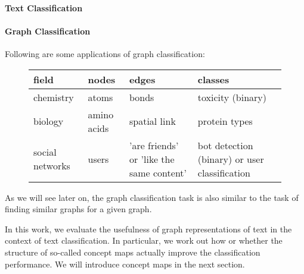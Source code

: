 

\paragraph{Text Classification}

\paragraph{Graph Classification}

Following are some applications of graph classification:

\begin{figure}[ht]
\centering
\begin{tabular}{llll}
field & nodes & edges & classes \\
\midrule
chemistry & atoms & bonds & toxicity (binary) \\
biology & amino acids & spatial link & protein types \\ 
social networks & users & 'are friends' or 'like the same content' & bot detection (binary) or user classification
\end{tabular}
\end{figure}

As we will see later on, the graph classification task is also similar to the task of finding similar graphs for a given graph.

In this work, we evaluate the usefulness of graph representations of text in the context of text classification. In particular, we work out how or whether the structure of so-called concept maps actually improve the classification performance.
We will introduce concept maps in the next section.

